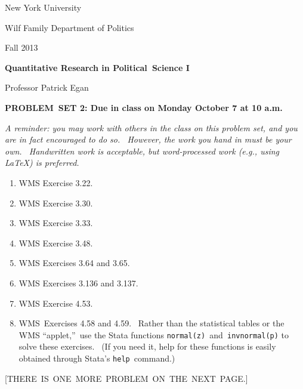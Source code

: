 \documentclass[11pt]{article}
\begin{document}
New York University

Wilf Family Department of Politics

Fall 2013

\begin{center}
{\large \textbf{Quantitative Research in Political\ Science I}}

Professor Patrick Egan

\bigskip

\textbf{PROBLEM\ SET 2: Due in class on Monday October 7 at 10 a.m.}
\end{center}

\textit{A reminder: you may work with others in the class on this problem
set, and you are in fact encouraged to do so. \ However, the work you hand
in must be your own. \ Handwritten work is acceptable, but word-processed
work (e.g., using LaTeX) is preferred.}

\begin{enumerate}
\item WMS Exercise 3.22.

\item WMS Exercise 3.30.

\item WMS Exercise 3.33.

\item WMS Exercise 3.48.

\item WMS Exercises 3.64 and 3.65.

\item WMS Exercises 3.136 and 3.137.

\item WMS Exercise 4.53.

\item WMS\ Exercises 4.58 and 4.59. \ Rather than the statistical tables or
the WMS \textquotedblleft applet,\textquotedblright\ use the Stata functions 
\texttt{normal(z) }and\texttt{\ invnormal(p)} to solve these exercises. \
(If you need it, help for these functions is easily obtained through Stata's 
\texttt{help }command.) \medskip 
\end{enumerate}

\begin{center}
[THERE\ IS\ ONE\ MORE\ PROBLEM\ ON\ THE\ NEXT\ PAGE.]\newpage
\end{center}
\end{document}
